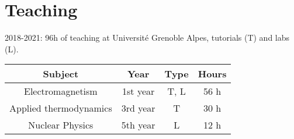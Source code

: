 \section{Teaching}\label{teaching}

2018-2021: 96h of teaching at Université Grenoble Alpes, tutorials (T) and labs (L).

\vspace{15pt}
\begin{table}[H]
    \centering
    \small
    {\def\arraystretch{1.}\tabcolsep=20pt
    \begin{tabular}{c c c c}
    \toprule
    \textbf{Subject} & \textbf{Year} & \textbf{Type} & \textbf{Hours} \\
    \midrule
    Electromagnetism       & 1st year  & T, L & 56 h \\[5pt]
    Applied thermodynamics & 3rd year  & T    & 30 h \\[5pt]
    Nuclear Physics        & 5th year  & L    & 12 h  \\
    \bottomrule
    \end{tabular}}
\end{table}
\normalsize
